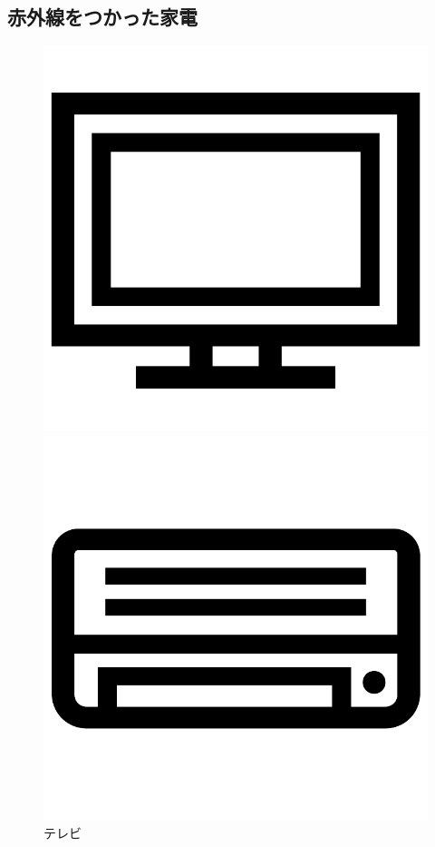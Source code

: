 \subsection{赤外線をつかった家電}

\begin{figure}[H]
  \begin{minipage}[t]{0.3\columnwidth}
    \centering
 \includegraphics[scale=0.1]{images/chap05/text05-img038.png}
    \caption{テレビ}
  \end{minipage}
  \begin{minipage}[t]{0.3\columnwidth}
    \centering
    \includegraphics[scale=0.1]{images/chap05/text05-img039.png}

\end{minipage}
\end{figure}
